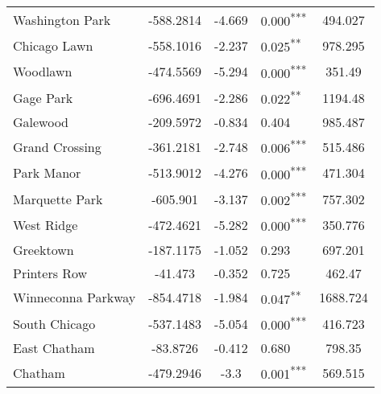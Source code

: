 \documentclass[12pt]{report}
\begin{document}
\begin{longtable}{l S[table-format=6.4] S[table-format=3.4] l S[table-format=4.4]}
	Washington Park              & -588.2814            & -4.669           & 0.000\textsuperscript{***} & 494.027                           \\
	Chicago Lawn                 & -558.1016            & -2.237           & 0.025\textsuperscript{**}  & 978.295                           \\
	Woodlawn                     & -474.5569            & -5.294           & 0.000\textsuperscript{***} & 351.49                            \\
	Gage Park                    & -696.4691            & -2.286           & 0.022\textsuperscript{**}  & 1194.48                           \\
	Galewood                     & -209.5972            & -0.834           & 0.404                      & 985.487                           \\
	Grand Crossing               & -361.2181            & -2.748           & 0.006\textsuperscript{***} & 515.486                           \\
	Park Manor                   & -513.9012            & -4.276           & 0.000\textsuperscript{***} & 471.304                           \\
	Marquette Park               & -605.901             & -3.137           & 0.002\textsuperscript{***} & 757.302                           \\
	West Ridge                   & -472.4621            & -5.282           & 0.000\textsuperscript{***} & 350.776                           \\
	Greektown                    & -187.1175            & -1.052           & 0.293                      & 697.201                           \\
	Printers Row                 & -41.473              & -0.352           & 0.725                      & 462.47                            \\
	Winneconna Parkway           & -854.4718            & -1.984           & 0.047\textsuperscript{**}  & 1688.724                          \\
	South Chicago                & -537.1483            & -5.054           & 0.000\textsuperscript{***} & 416.723                           \\
	East Chatham                 & -83.8726             & -0.412           & 0.680                      & 798.35                            \\
	Chatham                      & -479.2946            & -3.3             & 0.001\textsuperscript{***} & 569.515                           \\

\end{longtable}
\end{document}
